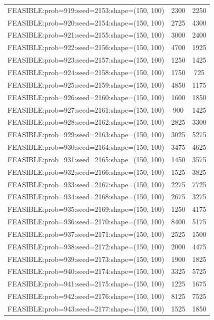 \begin{longtable}{lcc}
FEASIBLE:prob=919:seed=2153:shape=(150, 100) &     2300 &  2250 \\
FEASIBLE:prob=920:seed=2154:shape=(150, 100) &     2725 &  4300 \\
FEASIBLE:prob=921:seed=2155:shape=(150, 100) &     3000 &  2400 \\
FEASIBLE:prob=922:seed=2156:shape=(150, 100) &     4700 &  1925 \\
FEASIBLE:prob=923:seed=2157:shape=(150, 100) &     1250 &  1425 \\
FEASIBLE:prob=924:seed=2158:shape=(150, 100) &     1750 &   725 \\
FEASIBLE:prob=925:seed=2159:shape=(150, 100) &     4850 &  1175 \\
FEASIBLE:prob=926:seed=2160:shape=(150, 100) &     1600 &  1850 \\
FEASIBLE:prob=927:seed=2161:shape=(150, 100) &      900 &  1425 \\
FEASIBLE:prob=928:seed=2162:shape=(150, 100) &     2825 &  3300 \\
FEASIBLE:prob=929:seed=2163:shape=(150, 100) &     3025 &  5275 \\
FEASIBLE:prob=930:seed=2164:shape=(150, 100) &     3475 &  4625 \\
FEASIBLE:prob=931:seed=2165:shape=(150, 100) &     1450 &  3575 \\
FEASIBLE:prob=932:seed=2166:shape=(150, 100) &     1525 &  3825 \\
FEASIBLE:prob=933:seed=2167:shape=(150, 100) &     2275 &  7725 \\
FEASIBLE:prob=934:seed=2168:shape=(150, 100) &     2675 &  3275 \\
FEASIBLE:prob=935:seed=2169:shape=(150, 100) &     1250 &  4175 \\
FEASIBLE:prob=936:seed=2170:shape=(150, 100) &     8400 &  5175 \\
FEASIBLE:prob=937:seed=2171:shape=(150, 100) &     2525 &  1500 \\
FEASIBLE:prob=938:seed=2172:shape=(150, 100) &     2000 &  4475 \\
FEASIBLE:prob=939:seed=2173:shape=(150, 100) &     1900 &  1825 \\
FEASIBLE:prob=940:seed=2174:shape=(150, 100) &     3325 &  5725 \\
FEASIBLE:prob=941:seed=2175:shape=(150, 100) &     1225 &  1675 \\
FEASIBLE:prob=942:seed=2176:shape=(150, 100) &     8125 &  7525 \\
FEASIBLE:prob=943:seed=2177:shape=(150, 100) &     1525 &  1850 \\

\end{longtable}
